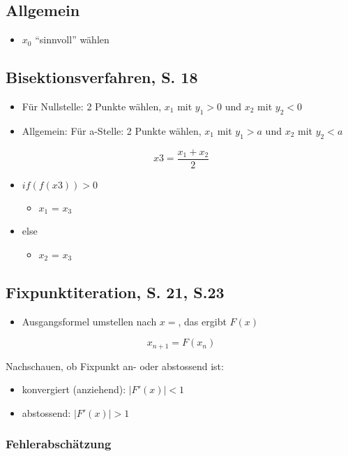 
\subsection{Allgemein}
\begin{itemize}
\item $x_0$ "`sinnvoll"' wählen
\end{itemize}

\subsection{Bisektionsverfahren, S. 18}

\begin{itemize}
\item Für Nullstelle: 2 Punkte wählen, $x_1$ mit $y_1 > 0$ und $x_2$ mit $y_2 < 0$
\item Allgemein: Für a-Stelle: 2 Punkte wählen, $x_1$ mit $y_1 > a$ und $x_2$ mit $y_2 < a$
\end{itemize}
\[x3 = \frac{x_1 + x_2}{2}\]

\begin{itemize}
\item $if(f(x3)) > 0$
\begin{itemize}
\item $x_1$ = $x_3$
\end{itemize}
\item else
\begin{itemize}
\item $x_2$ = $x_3$
\end{itemize}
\end{itemize}

\subsection{Fixpunktiteration, S. 21, S.23}
\begin{itemize}
\item Ausgangsformel umstellen nach $x = $, das ergibt $F(x)$
\end{itemize}
\[x_{n+1} = F(x_n)\]

Nachschauen, ob Fixpunkt an- oder abstossend ist:
\begin{itemize}
\item konvergiert (anziehend): $|F'(x)| < 1$
\item abstossend: $|F'(x)| > 1$
\end{itemize}


\subsubsection{Fehlerabschätzung}

